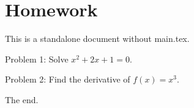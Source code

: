 \documentclass{article}
\begin{document}
\section{Homework}

This is a standalone document without main.tex.

Problem 1: Solve $x^2 + 2x + 1 = 0$.

Problem 2: Find the derivative of $f(x) = x^3$.

The end.
\end{document}
